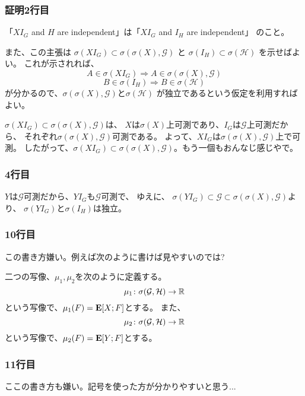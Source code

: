       \subsubsection{証明2行目}
        「$XI_G$ and $H$ are independent」は「$XI_G$ and $I_H$ are independent」
        のこと。

        また、この主張は
        $\sigma(XI_G) \subset \sigma(\sigma(X), \mathcal{G})$
        と
        $\sigma(I_H) \subset \sigma(\mathcal{H})$
        を示せばよい。
        これが示されれば、
        \[
          A \in \sigma(XI_G) \Rightarrow A \in \sigma(\sigma(X), \mathcal{G})
        \]
        \[
          B \in \sigma(I_H) \Rightarrow B \in \sigma(\mathcal{H})
        \]
        が分かるので、$\sigma(\sigma(X), \mathcal{G})$と$\sigma(\mathcal{H})$
        が独立であるという仮定を利用すればよい。

        $\sigma(XI_G) \subset \sigma(\sigma(X), \mathcal{G})$は、
        $X$は$\sigma(X)$上可測であり、$I_G$は$\mathcal{G}$上可測だから、
        それぞれ$\sigma(\sigma(X), \mathcal{G})$可測である。
        よって、$XI_G$は$\sigma(\sigma(X), \mathcal{G})$上で可測。
        したがって、$\sigma(XI_G) \subset \sigma(\sigma(X), \mathcal{G})$。もう一個もおんなじ感じやで。

      \subsubsection{4行目}
        $Y$は$\mathcal{G}$可測だから、$YI_G$も$\mathcal{G}$可測で、
        ゆえに、
        $\sigma(YI_G) \subset \mathcal{G} \subset \sigma(\sigma(X),\mathcal{G})$より、
        $\sigma(YI_G)$と$\sigma(I_H)$は独立。

      \subsubsection{10行目}
        この書き方嫌い。例えば次のように書けば見やすいのでは?

        二つの写像、$\mu_1, \mu_2$を次のように定義する。
        \[
        \mu_1 \colon \sigma(\mathcal{G},\mathcal{H}) \rightarrow {\mathbb{R}}
        \]
        という写像で、$\mu_1(F) = {\mathbf{E}}[X ; F]$とする。
        また、
        \[
        \mu_2 \colon \sigma(\mathcal{G},\mathcal{H}) \rightarrow {\mathbb{R}}
        \]
        という写像で、$\mu_2(F) = {\mathbf{E}}[Y ; F]$とする。

      \subsubsection{11行目}
        ここの書き方も嫌い。記号を使った方が分かりやすいと思う...

